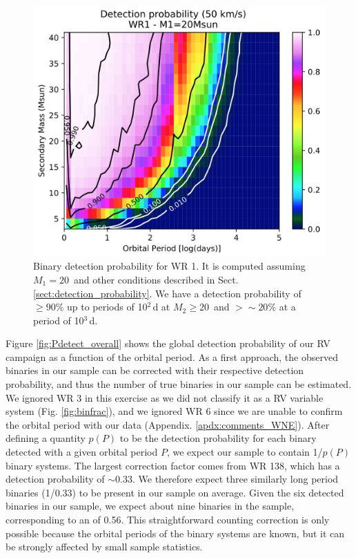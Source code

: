 \begin{figure}[t]
    \centering
    \includegraphics[width=\textwidth]{chapters/WNE/image/Pdetect_WR1.png}
    \caption{Binary detection probability for WR 1. It is computed assuming $M_1 = 20$\,\Msun{} and other conditions described in Sect. \ref{sect:detection_probability}. We have a detection probability of $\ge90$\% up to periods of 10$^2$\,d at $M_2\ge20$\,\Msun{} and $>{\sim}20$\% at a period of 10$^3$\,d.}
    \label{fig:Pdetect_WR1}
\end{figure}

Figure \ref{fig:Pdetect_overall} shows the global detection probability of our RV campaign as a function of the orbital period. As a first approach, the observed binaries in our sample can be corrected with their respective detection probability, and thus the number of true binaries in our sample can be estimated. We ignored WR 3 in this exercise as we did not classify it as a RV variable system (Fig. \ref{fig:binfrac}), and we ignored WR 6 since we are unable to confirm the orbital period with our data (Appendix. \ref{apdx:comments_WNE}). After defining a quantity $p(P)$ to be the detection probability for each binary detected with a given orbital period $P$, we expect our sample to contain 1/$p(P)$ binary systems. The largest correction factor comes from WR 138, which has a detection probability of ${\sim}0.33$. We therefore expect three similarly long period binaries (1/0.33) to be present in our sample on average. Given the six detected binaries in our sample, we expect about nine binaries in the sample, corresponding to an \fintWNE{} of 0.56. This straightforward counting correction is only possible because the orbital periods of the binary systems are known, but it can be strongly affected by small sample statistics. 

